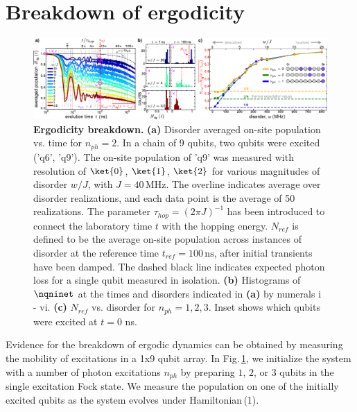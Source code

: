 \section{Breakdown of ergodicity} %
\begin{figure}[t] %
 \centering
 \includegraphics[width=160mm]{./PDF/fig_2.pdf}
 \caption{
 \textbf{Ergodicity breakdown.} \textbf{(a)} Disorder averaged on-site population vs. time for $n_{ph}=2$. In a chain of 9 qubits, two qubits were excited ('q6', 'q9'). The on-site population of 'q9' was measured with resolution of $\ket{0}$, $\ket{1}$, $\ket{2}$ for various magnitudes of disorder $w/J$, with $J=40\,\text{MHz}$. The overline indicates average over disorder realizations, and each data point is the average of 50 realizations. The parameter $\tau_{hop}=\left(2 \pi J \right)^{-1}$ has been introduced to connect the laboratory time $t$ with the hopping energy. $N_{ref}$ is defined to be the average on-site population across instances of disorder at the reference time $t_{ref}=100\,\text{ns}$, after initial transients have been damped. The dashed black line indicates expected photon loss for a single qubit measured in isolation. \textbf{(b)} Histograms of $\nqninet$  at the times and disorders indicated in \textbf{(a)} by numerals i - vi. \textbf{(c)} $N_{ref}$ vs. disorder for $n_{ph}=1, 2, 3$. Inset shows which qubits were excited at $t=0$ ns.}
 \vspace{-1em}
 \label{ch5:ergodicity_breaking}
\end{figure}
Evidence for the breakdown of ergodic dynamics can be obtained by measuring the mobility of excitations in a 1x9 qubit array. In Fig.\,\ref{ch5:ergodicity_breaking}, we initialize the system with a number of photon excitations $n_{ph}$ by preparing $1$, $2$, or $3$ qubits in the single excitation Fock state. We measure the population on one of the initially excited qubits as the system evolves under Hamiltonian\,(1).

